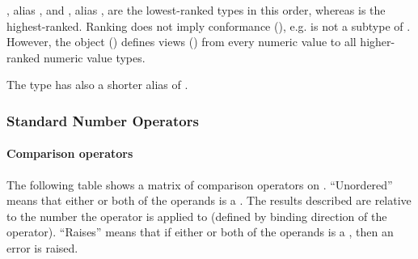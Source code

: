 , alias , and , alias , are the lowest-ranked types in this order, whereas  is the highest-ranked. Ranking does not imply conformance (), e.g.  is not a subtype of . However, the object  () defines views () from every numeric value to all higher-ranked numeric value types. 

The  type has also a shorter alias of . 





\subsubsection{Standard Number Operators}

\paragraph{Comparison operators}
The following table shows a matrix of comparison operators on . ``Unordered'' means that either or both of the operands is a . The results described are relative to the number the operator is applied to (defined by binding direction of the operator). ``Raises'' means that if either or both of the operands is a , then an error is raised. 

